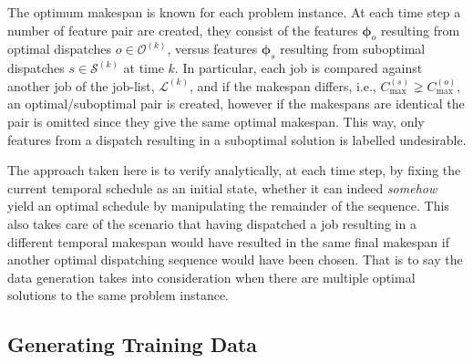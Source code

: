 \documentclass[smallextended]{svjour3}
\renewcommand{\vphi}{\bm \phi}
\begin{document}
The optimum makespan is known for each problem instance. At each time step a 
number of feature pair are created, they consist of the features $\vphi_o$ 
resulting from optimal dispatches $o\in\mathcal{O}^{(k)}$, versus features 
$\vphi_s$ resulting from suboptimal dispatches $s\in\mathcal{S}^{(k)}$ at time 
$k$. %
In particular, each job is compared against another job of the job-list, 
$\mathcal{L}^{(k)}$, and if the makespan differs, i.e., $C_{\max}^{(s)}\gneq 
C_{\max}^{(o)}$, an optimal/suboptimal pair is created, however if the 
makespans are identical the pair is omitted since they give the same optimal 
makespan. This way, only features from a dispatch resulting in a suboptimal 
solution is labelled undesirable.

The approach taken here is to verify analytically, at each time step, by fixing 
the current temporal schedule as an initial state, whether it can indeed 
\emph{somehow} yield an optimal schedule by manipulating the remainder of the 
sequence. This also takes care of the scenario that having dispatched a job 
resulting in a different temporal makespan would have resulted in the same 
final makespan if another optimal dispatching sequence would have been chosen. 
That is to say the data generation takes into consideration when there are 
multiple optimal solutions to the same problem instance. 

\subsection{Generating Training Data}\label{sec:gentrdata}
\end{document}
